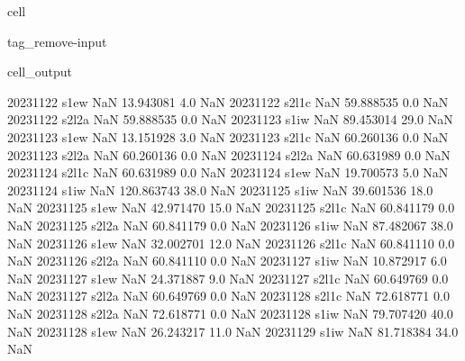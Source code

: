 \documentclass[letterpaper,10pt,english]{jupyterBook}
\begin{document}
\begin{sphinxuseclass}{cell}
\begin{sphinxuseclass}{tag_remove-input}
\begin{sphinxVerbatimOutput}
\begin{sphinxuseclass}{cell_output}
\begin{sphinxVerbatim}[commandchars=\\\{\}]
2023\PYGZhy{}11\PYGZhy{}22        s1\PYGZus{}ew           NaN   13.943081     4.0         NaN
2023\PYGZhy{}11\PYGZhy{}22       s2\PYGZus{}l1c           NaN   59.888535     0.0         NaN
2023\PYGZhy{}11\PYGZhy{}22       s2\PYGZus{}l2a           NaN   59.888535     0.0         NaN
2023\PYGZhy{}11\PYGZhy{}23        s1\PYGZus{}iw           NaN   89.453014    29.0         NaN
2023\PYGZhy{}11\PYGZhy{}23        s1\PYGZus{}ew           NaN   13.151928     3.0         NaN
2023\PYGZhy{}11\PYGZhy{}23       s2\PYGZus{}l1c           NaN   60.260136     0.0         NaN
2023\PYGZhy{}11\PYGZhy{}23       s2\PYGZus{}l2a           NaN   60.260136     0.0         NaN
2023\PYGZhy{}11\PYGZhy{}24       s2\PYGZus{}l2a           NaN   60.631989     0.0         NaN
2023\PYGZhy{}11\PYGZhy{}24       s2\PYGZus{}l1c           NaN   60.631989     0.0         NaN
2023\PYGZhy{}11\PYGZhy{}24        s1\PYGZus{}ew           NaN   19.700573     5.0         NaN
2023\PYGZhy{}11\PYGZhy{}24        s1\PYGZus{}iw           NaN  120.863743    38.0         NaN
2023\PYGZhy{}11\PYGZhy{}25        s1\PYGZus{}iw           NaN   39.601536    18.0         NaN
2023\PYGZhy{}11\PYGZhy{}25        s1\PYGZus{}ew           NaN   42.971470    15.0         NaN
2023\PYGZhy{}11\PYGZhy{}25       s2\PYGZus{}l1c           NaN   60.841179     0.0         NaN
2023\PYGZhy{}11\PYGZhy{}25       s2\PYGZus{}l2a           NaN   60.841179     0.0         NaN
2023\PYGZhy{}11\PYGZhy{}26        s1\PYGZus{}iw           NaN   87.482067    38.0         NaN
2023\PYGZhy{}11\PYGZhy{}26        s1\PYGZus{}ew           NaN   32.002701    12.0         NaN
2023\PYGZhy{}11\PYGZhy{}26       s2\PYGZus{}l1c           NaN   60.841110     0.0         NaN
2023\PYGZhy{}11\PYGZhy{}26       s2\PYGZus{}l2a           NaN   60.841110     0.0         NaN
2023\PYGZhy{}11\PYGZhy{}27        s1\PYGZus{}iw           NaN   10.872917     6.0         NaN
2023\PYGZhy{}11\PYGZhy{}27        s1\PYGZus{}ew           NaN   24.371887     9.0         NaN
2023\PYGZhy{}11\PYGZhy{}27       s2\PYGZus{}l1c           NaN   60.649769     0.0         NaN
2023\PYGZhy{}11\PYGZhy{}27       s2\PYGZus{}l2a           NaN   60.649769     0.0         NaN
2023\PYGZhy{}11\PYGZhy{}28       s2\PYGZus{}l1c           NaN   72.618771     0.0         NaN
2023\PYGZhy{}11\PYGZhy{}28       s2\PYGZus{}l2a           NaN   72.618771     0.0         NaN
2023\PYGZhy{}11\PYGZhy{}28        s1\PYGZus{}iw           NaN   79.707420    40.0         NaN
2023\PYGZhy{}11\PYGZhy{}28        s1\PYGZus{}ew           NaN   26.243217    11.0         NaN
2023\PYGZhy{}11\PYGZhy{}29        s1\PYGZus{}iw           NaN   81.718384    34.0         NaN

\end{sphinxVerbatim}
\end{sphinxuseclass}
\end{sphinxVerbatimOutput}
\end{sphinxuseclass}
\end{sphinxuseclass}
\end{document}
